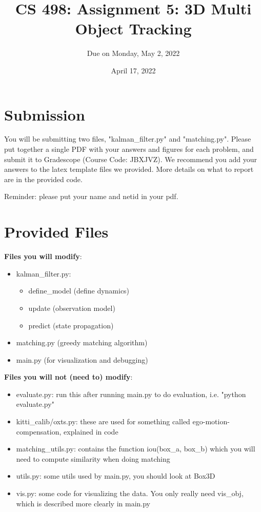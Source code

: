 \documentclass[11pt]{article}
\begin{document}
\author{Due on Monday, May 2, 2022}
\title{CS 498: Assignment 5: 3D Multi Object Tracking}
\date{April 17, 2022}
\maketitle

\medskip


\section*{Submission}

You will be submitting two files, "kalman\_filter.py" and "matching.py". Please put together a single PDF with your answers and figures for each problem, and submit it to Gradescope (Course Code: JBXJVZ). 
We recommend you add your answers to the latex template files we provided. More details on what to report are in the provided code. 

Reminder: please put your name and netid in your pdf.

\section*{Provided Files}

\textbf{Files you will modify}:
\begin{itemize}
    \item kalman\_filter.py: 
    \begin{itemize}
        \item define\_model (define dynamics)
        \item update (observation model)
        \item predict (state propagation)
    \end{itemize}
    \item matching.py (greedy matching algorithm)
    \item main.py (for visualization and debugging)
\end{itemize}

\noindent \textbf{Files you will not (need to) modify}:
\begin{itemize}
    \item evaluate.py: run this after running main.py to do evaluation, i.e. "python evaluate.py"
    \item kitti\_calib/oxts.py: these are used for something called ego-motion-compensation, explained in code
    \item matching\_utils.py: contains the function iou(box\_a, box\_b) which you will need to compute similarity when doing matching
    \item utils.py: some utils used by main.py, you should look at Box3D
    \item vis.py: some code for visualizing the data. You only really need vis\_obj, which is described more clearly in main.py
\end{itemize}
\end{document}
